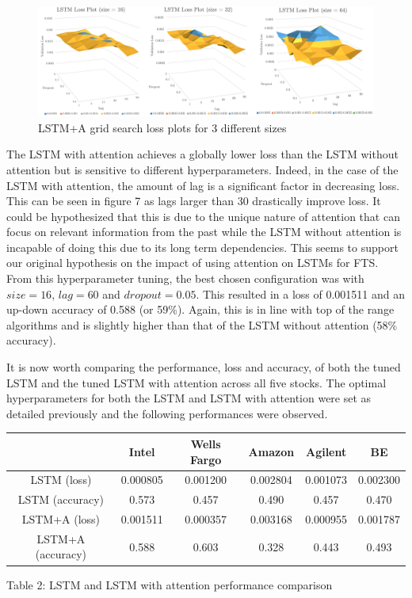 \documentclass{article}
\begin{document}
\begin{figure}[!h]
	\includegraphics[width=395pt]{LSTMAgrid.png}
	\caption{LSTM+A grid search loss plots for 3 different sizes}
\end{figure}

The LSTM with attention achieves a globally lower loss than the LSTM without attention but is sensitive to different hyperparameters. Indeed, in the case of the LSTM with attention, the amount of lag is a significant factor in decreasing loss. This can be seen in figure 7 as lags larger than 30 drastically improve loss. It could be hypothesized that this is due to the unique nature of attention that can focus on relevant information from the past while the LSTM without attention is incapable of doing this due to its long term dependencies. This seems to support our original hypothesis on the impact of using attention on LSTMs for FTS. From this hyperparameter tuning, the best chosen configuration was with $size=16$, $lag=60$ and $dropout=0.05$. This resulted in a loss of 0.001511 and an up-down accuracy of 0.588 (or 59\%). Again, this is in line with top of the range algorithms and is slightly higher than that of the LSTM without attention (58\% accuracy). 

It is now worth comparing the performance, loss and accuracy, of both the tuned LSTM and the tuned LSTM with attention across all five stocks. The optimal hyperparameters for both the LSTM and LSTM with attention were set as detailed previously and the following performances were observed.

\begin{center}
 \begin{tabular}{||c c c c c c||} 
 \hline
   & Intel & Wells Fargo & Amazon & Agilent & BE \\ [0.5ex] 
 \hline\hline
 LSTM (loss) & 0.000805 & 0.001200 & 0.002804 & 0.001073 & 0.002300 \\ 
 \hline
 LSTM (accuracy) & 0.573 & 0.457 & 0.490 & 0.457 & 0.470 \\
 \hline
 LSTM+A (loss) & 0.001511 & 0.000357 & 0.003168 & 0.000955 & 0.001787\\ 
 \hline
 LSTM+A (accuracy) & 0.588 & 0.603 & 0.328 & 0.443 & 0.493\\
 \hline
\end{tabular}
\end{center}
\begin{center}
    Table 2: LSTM and LSTM with attention performance comparison    
\end{center}
\end{document}
